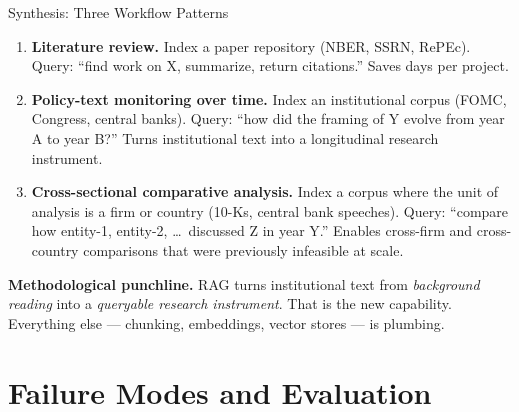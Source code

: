 \documentclass[10pt,english,aspectratio=169]{beamer}
\begin{document}
\begin{frame}{Synthesis: Three Workflow Patterns}
\begin{enumerate}
\item \textbf{Literature review.} Index a paper repository (NBER, SSRN, RePEc). Query: ``find work on X, summarize, return citations.'' Saves days per project.

\medskip
\item \textbf{Policy-text monitoring over time.} Index an institutional corpus (FOMC, Congress, central banks). Query: ``how did the framing of Y evolve from year A to year B?'' Turns institutional text into a longitudinal research instrument.

\medskip
\item \textbf{Cross-sectional comparative analysis.} Index a corpus where the unit of analysis is a firm or country (10-Ks, central bank speeches). Query: ``compare how entity-1, entity-2, \dots\ discussed Z in year Y.'' Enables cross-firm and cross-country comparisons that were previously infeasible at scale.
\end{enumerate}

\bigskip
\textbf{Methodological punchline.} RAG turns institutional text from \emph{background reading} into a \emph{queryable research instrument}. That is the new capability. Everything else --- chunking, embeddings, vector stores --- is plumbing.
\end{frame}

\section{Failure Modes and Evaluation}
\end{document}
